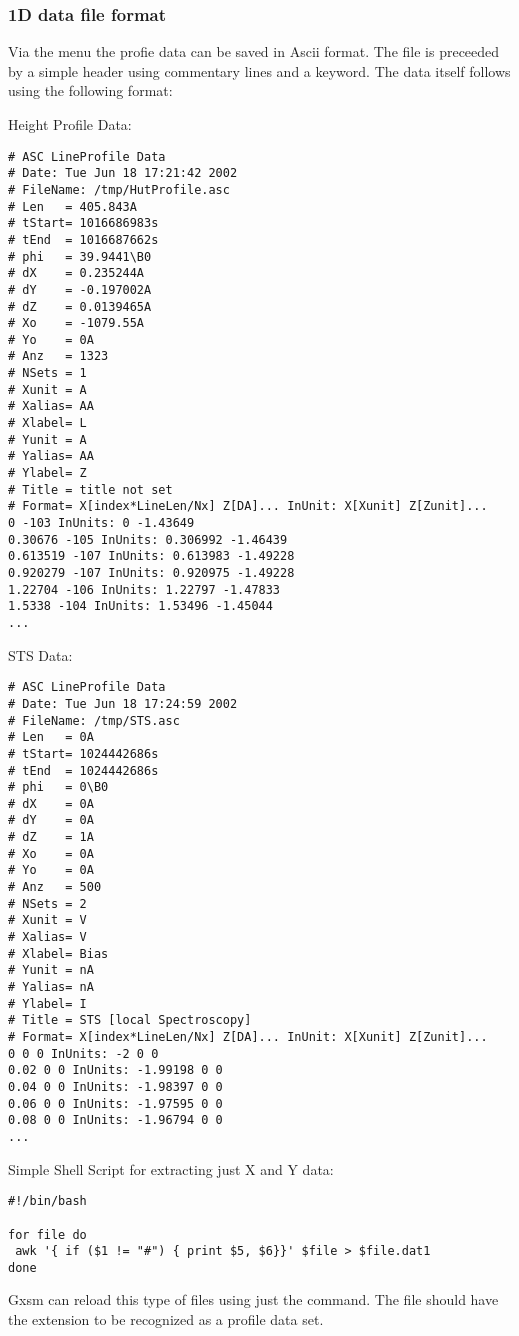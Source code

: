 \subsubsection{1D data file format}

Via the  menu the profie data can be saved in Ascii
format. The file is preceeded by a simple header using commentary
lines and a keyword. The data itself follows using the following format:

Height Profile Data:

\begin{verbatim}
# ASC LineProfile Data
# Date: Tue Jun 18 17:21:42 2002
# FileName: /tmp/HutProfile.asc
# Len   = 405.843A
# tStart= 1016686983s
# tEnd  = 1016687662s
# phi   = 39.9441\B0
# dX    = 0.235244A
# dY    = -0.197002A
# dZ    = 0.0139465A
# Xo    = -1079.55A
# Yo    = 0A
# Anz   = 1323
# NSets = 1
# Xunit = A
# Xalias= AA
# Xlabel= L
# Yunit = A
# Yalias= AA
# Ylabel= Z
# Title = title not set
# Format= X[index*LineLen/Nx] Z[DA]... InUnit: X[Xunit] Z[Zunit]...
0 -103 InUnits: 0 -1.43649
0.30676 -105 InUnits: 0.306992 -1.46439
0.613519 -107 InUnits: 0.613983 -1.49228
0.920279 -107 InUnits: 0.920975 -1.49228
1.22704 -106 InUnits: 1.22797 -1.47833
1.5338 -104 InUnits: 1.53496 -1.45044
...
\end{verbatim}

STS Data:

\begin{verbatim}
# ASC LineProfile Data
# Date: Tue Jun 18 17:24:59 2002
# FileName: /tmp/STS.asc
# Len   = 0A
# tStart= 1024442686s
# tEnd  = 1024442686s
# phi   = 0\B0
# dX    = 0A
# dY    = 0A
# dZ    = 1A
# Xo    = 0A
# Yo    = 0A
# Anz   = 500
# NSets = 2
# Xunit = V
# Xalias= V
# Xlabel= Bias
# Yunit = nA
# Yalias= nA
# Ylabel= I
# Title = STS [local Spectroscopy]
# Format= X[index*LineLen/Nx] Z[DA]... InUnit: X[Xunit] Z[Zunit]...
0 0 0 InUnits: -2 0 0
0.02 0 0 InUnits: -1.99198 0 0
0.04 0 0 InUnits: -1.98397 0 0
0.06 0 0 InUnits: -1.97595 0 0
0.08 0 0 InUnits: -1.96794 0 0
...
\end{verbatim}


Simple Shell Script for extracting just X and Y data:

\begin{verbatim}
#!/bin/bash

for file do
 awk '{ if ($1 != "#") { print $5, $6}}' $file > $file.dat1
done
\end{verbatim}

Gxsm can reload this type of files using just the 
command. The file should have the  extension to be
recognized as a profile data set.


